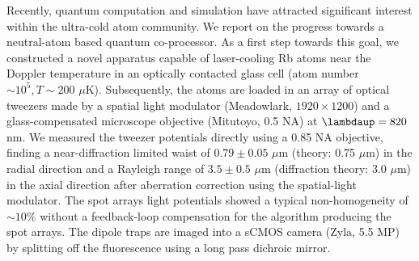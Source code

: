 \noindent Recently, quantum computation and simulation have attracted significant interest within the ultra-cold atom community.
We report on the progress towards a neutral-atom based quantum co-processor.
As a first step towards this goal, we constructed a novel apparatus capable of laser-cooling Rb atoms near the Doppler temperature in an optically contacted glass cell (atom number $\sim 10^5, T\sim 200$ $\mu$K). 
Subsequently, the atoms are loaded in an array of optical tweezers made by a spatial light modulator (Meadowlark, $1920 \times 1200$) and a glass-compensated microscope objective (Mitutoyo, 0.5 NA) at $\lambdaup = 820$ nm.
We measured the tweezer potentials directly using a 0.85 NA objective, finding a near-diffraction limited waist of $0.79\pm0.05$ $\mu$m (theory: 0.75 $\mu$m) in the radial direction and a Rayleigh range of $3.5 \pm 0.5$ $\mu$m (diffraction theory: 3.0 $\mu$m) in the axial direction after aberration correction using the spatial-light modulator. 
The spot arrays light potentials showed a typical non-homogeneity of $\sim 10\%$ without a feedback-loop compensation for the algorithm producing the spot arrays. 
The dipole traps are imaged into a sCMOS camera (Zyla, 5.5 MP) by splitting off the fluorescence using a long pass dichroic mirror.
